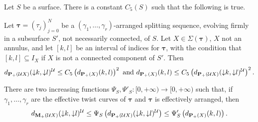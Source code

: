 \begin{prop}\label{prp:locallyfinite}
Let $S$ be a surface. There is a constant $C_5(S)$ such that the following is true.

Let $\bm\tau=(\tau_j)_{j=0}^N$ be a $(\gamma_1,\ldots,\gamma_r)$-arranged splitting sequence, evolving firmly in a subsurface $S'$, not necessarily connected, of $S$. Let $X\in \Sigma(\bm\tau)$, $X$ not an annulus, and let $[k,l]$ be an interval of indices for $\bm\tau$, with the condition that $[k,l]\subseteq I_X$ if $X$ is not a connected component of $S'$. Then
$$
d_{{\mathbf{P}_+}({\mathcal U} X)}(\mathord{\downarrow} k,\mathord{\downarrow} l)^{\mathcal U} \leq C_5 \left(d_{{\mathbf{P}_+}(X)}(k,l)\right)^2
\text{ and }
d_{{\mathbf{P}_+}(X)}(k,l) \leq C_5 \left(d_{{\mathbf{P}_+}({\mathcal U} X)}(\mathord{\downarrow} k,\mathord{\downarrow} l)^{\mathcal U}\right)^2.
$$

There are two increasing functions $\Psi_S, \Psi'_S:[0,+\infty)\rightarrow [0,+\infty)$ such that, if $\gamma_1,\ldots,\gamma_r$ are the effective twist curves of $\bm\tau$ and $\bm\tau$ is effectively arranged, then
$$
d_{{\mathbf{M}_+}({\mathcal U} X)}(\mathord{\downarrow} k,\mathord{\downarrow} l)^{\mathcal U} \leq \Psi_S\left(d_{{\mathbf{P}_+}({\mathcal U} X)}(\mathord{\downarrow} k,\mathord{\downarrow} l)^{\mathcal U}\right) \leq \Psi'_S\left( d_{{\mathbf{P}_+}(X)}(k,l) \right).
$$
\end{prop}
